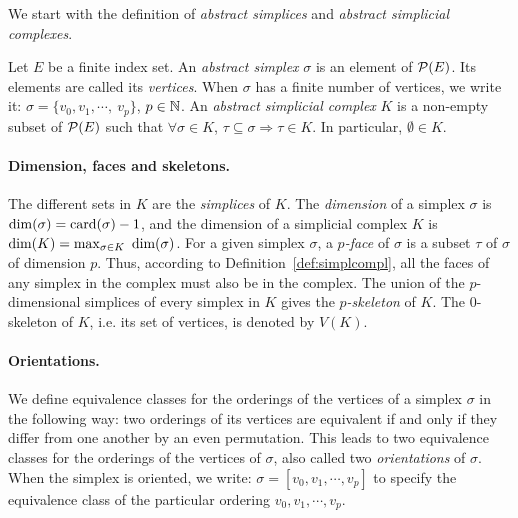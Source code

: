 We start with the definition of {\em abstract simplices} and {\em abstract simplicial complexes}. 

\begin{defin}\label{def:simplcompl}
Let $E$ be a finite index set. An {\em abstract simplex} $\sigma$ is an element of $\mathcal P(E)$. 
Its elements are called its {\em vertices}. 
When $\sigma$ has a finite number of vertices, we write it: $\sigma=\{v_{0},v_{1},\cdots,\ v_{p}\}$, $p\in\mathbb{N}$.
An {\em abstract simplicial complex} $K$ is a non-empty subset of $\mathcal P(E)$ such that 
$\forall\sigma\in K$, $\tau\subseteq\sigma \Rightarrow \tau\in K$. In particular, $\emptyset\in K$. 
\end{defin}

\paragraph*{Dimension, faces and skeletons.} The different sets in $K$ are the {\em simplices} of $K$. 
The {\em dimension} of a simplex $\sigma$ is 
${\rm dim}(\sigma)={\rm card}(\sigma)-1$, and the dimension of a simplicial complex $K$ is 
${\rm dim}(K)=\max_{\sigma\in K}\ \text{dim}(\sigma)$. 
For a given simplex $\sigma$, a {\em $p$-face} of $\sigma$ is a subset $\tau$ of $\sigma$ of dimension $p$. 
Thus, according to Definition~\ref{def:simplcompl}, all the faces of any simplex in the complex must also be in the complex. 
The union of the $p$-dimensional simplices of every simplex in $K$ gives the
{\em $p$-skeleton} of $K$.
The 0-skeleton of $K$, i.e. its set of vertices, is denoted by $V(K)$. 

\paragraph*{Orientations.} We define equivalence classes for the orderings of the vertices of a simplex $\sigma$ in the following way: 
two orderings of its vertices are equivalent if and only if they differ from one another by an even permutation. 
This leads to two equivalence classes for the orderings of the vertices of $\sigma$, also called two 
{\em orientations} of $\sigma$. When the simplex is oriented, we write: $\sigma=[v_{0},v_{1},\cdots, v_{p}]$ 
to specify the equivalence class of the particular ordering $v_{0},v_{1}, \cdots, v_{p}$.


